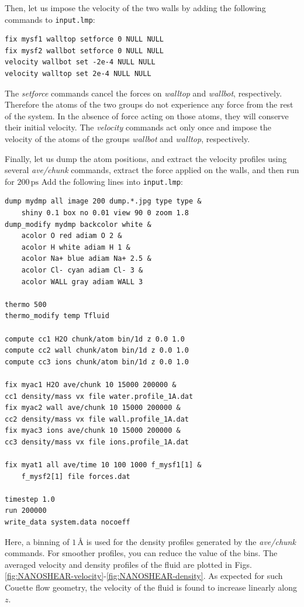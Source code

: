 \documentclass[9pt,tutorial]{livecoms}
\newcommand{\flecmd}[1]{\textcolor{command}{\texttt{#1}}} %
\begin{document}
Then, let us impose the velocity of the two walls by adding the following
commands to \flecmd{input.lmp}:
\begin{lstlisting}
fix mysf1 walltop setforce 0 NULL NULL
fix mysf2 wallbot setforce 0 NULL NULL
velocity wallbot set -2e-4 NULL NULL
velocity walltop set 2e-4 NULL NULL
\end{lstlisting}
The \textit{setforce} commands cancel the forces on \textit{walltop} and
\textit{wallbot}, respectively. Therefore the atoms of the two groups do not
experience any force from the rest of the system. In the absence of force acting
on those atoms, they will conserve their initial velocity. The \textit{velocity}
commands act only once and impose the velocity of the atoms of the groups
\textit{wallbot} and \textit{walltop}, respectively.

Finally, let us dump the atom positions, and extract the velocity profiles using
several \textit{ave/chunk} commands, extract the force applied on the walls, and
then run for $200\,\text{ps}$ Add the following lines into \flecmd{input.lmp}:
\begin{lstlisting}
dump mydmp all image 200 dump.*.jpg type type &
    shiny 0.1 box no 0.01 view 90 0 zoom 1.8
dump_modify mydmp backcolor white &
    acolor O red adiam O 2 &
    acolor H white adiam H 1 &
    acolor Na+ blue adiam Na+ 2.5 &
    acolor Cl- cyan adiam Cl- 3 &
    acolor WALL gray adiam WALL 3

thermo 500
thermo_modify temp Tfluid

compute cc1 H2O chunk/atom bin/1d z 0.0 1.0
compute cc2 wall chunk/atom bin/1d z 0.0 1.0
compute cc3 ions chunk/atom bin/1d z 0.0 1.0

fix myac1 H2O ave/chunk 10 15000 200000 &
cc1 density/mass vx file water.profile_1A.dat
fix myac2 wall ave/chunk 10 15000 200000 &
cc2 density/mass vx file wall.profile_1A.dat
fix myac3 ions ave/chunk 10 15000 200000 &
cc3 density/mass vx file ions.profile_1A.dat

fix myat1 all ave/time 10 100 1000 f_mysf1[1] &
    f_mysf2[1] file forces.dat

timestep 1.0
run 200000
write_data system.data nocoeff
\end{lstlisting}
Here, a binning of $1\,\text{\AA{}}$ is used for the density profiles generated
by the \textit{ave/chunk} commands. For smoother profiles, you can reduce the value
of the bins. The averaged velocity and density profiles of the fluid are plotted
in Figs.\ref{fig:NANOSHEAR-velocity}-\ref{fig:NANOSHEAR-density}. As expected for
such Couette flow geometry, the velocity of the fluid is found to increase linearly
along $z$.
\end{document}
